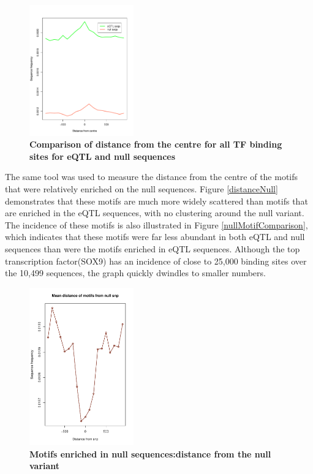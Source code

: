 \documentclass[12pt]{article}
\begin{document}
\begin{figure}[!htbp]
\centering
\includegraphics[width= 0.4\textwidth]{RplotEQTLandNullSequencesCompared.pdf} 
\caption{\bf{Comparison of distance from the centre for all TF binding sites for eQTL and null sequences}}
\label{distance}
\end{figure}

The same tool was used to measure the distance from the centre of the motifs that were relatively enriched on the null sequences. Figure \ref{distanceNull} demonstrates that these motifs are much more widely scattered than motifs that are enriched in the eQTL sequences, with no clustering around the null variant. The incidence of these motifs is also illustrated in Figure \ref{nullMotifComparison}, which indicates that these motifs were far less abundant in both eQTL and null sequences than were the motifs enriched in eQTL sequences. Although the top transcription factor(SOX9) has an incidence of close to 25,000 binding sites over the 10,499 sequences, the graph quickly dwindles to smaller numbers.

\begin{figure}[!htbp]
\centering
\includegraphics[width= 0.4\textwidth]{NullMotifsPlot.pdf} 
\caption{\bf{Motifs enriched in null sequences:distance from the null variant}}
\label{nullDistance}
\end{figure}
\end{document}
